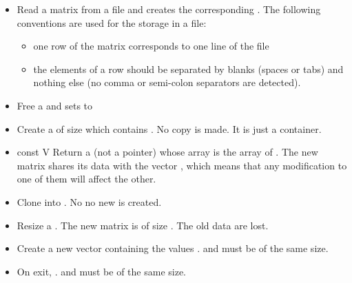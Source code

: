 \begin{itemize}
\item {}
  \sshortdescribe Read a matrix from a file and creates the corresponding
  . The following conventions are used for the storage in a
  file:
  \begin{itemize}
  \item one row of the matrix corresponds to one line of the file
  \item the elements of a row should be separated by blanks (spaces or tabs) and
    nothing else (no comma or semi-colon separators are detected).
  \end{itemize}

\item {}
  \sshortdescribe Free a  and sets  to  
\item {}
    \sshortdescribe Create a  of size  
    which contains . No copy is made. It is just a container.
\item {}
  {const  \ptr V}
  \sshortdescribe Return a  (not a pointer) whose array is
  the array of . The new matrix shares its data with the
  vector , which means that any modification to one of them will affect
  the other.


\item {}
  \sshortdescribe Clone  into . No no new
   is created.

\item {}
  \sshortdescribe Resize a . The new matrix is of size
  . The old data are lost.
\item {}
  \sshortdescribe Create a new vector containing the values .  and  must be of the same size.

\item {}
  \sshortdescribe On exit, .  and
   must be of the same size.


\end{itemize}

